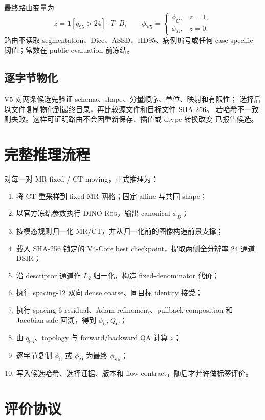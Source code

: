 \documentclass[11pt,a4paper]{ctexart}
\newcommand{\Dino}{\textsc{DINO-Reg}}
\begin{document}
最终路由变量为
\[
z=\mathbf{1}[q_{95}>24]\cdot T\cdot B,\qquad
\phi_{\mathrm{V5}}=
\begin{cases}
\phi_C,&z=1,\\
\phi_D,&z=0.
\end{cases}
\]
路由不读取 segmentation、Dice、ASSD、HD95、病例编号或任何 case-specific
阈值；常数在 public evaluation 前冻结。

\subsection{逐字节物化}
V5 对两条候选先验证 schema、shape、分量顺序、单位、映射和有限性；
选择后以文件复制物化到最终目录，再比较源文件和目标文件 SHA-256。
若哈希不一致则失败。这样可证明路由不会因重新保存、插值或 dtype 转换改变
已报告候选。

\section{完整推理流程}

对每一对 MR fixed / CT moving，正式推理为：
\begin{enumerate}
  \item 将 CT 重采样到 fixed MR 网格；固定 affine 与共同 shape；
  \item 以官方冻结参数执行 \Dino{}，输出 canonical $\phi_D$；
  \item 按模态规则归一化 MR/CT，并从归一化前的图像构造前景支撑；
  \item 载入 SHA-256 锁定的 V4-Core best checkpoint，提取两侧全分辨率
        24 通道 DSIR；
  \item 沿 descriptor 通道作 $L_2$ 归一化，构造 fixed-denominator 代价；
  \item 执行 spacing-12 双向 dense coarse、同目标 identity 接受；
  \item 执行 spacing-6 residual、Adam refinement、pullback composition 和
        Jacobian-safe 回溯，得到 $\phi_C,Q_C$；
  \item 由 $q_{95}$、topology 与 forward/backward QA 计算 $z$；
  \item 逐字节复制 $\phi_C$ 或 $\phi_D$ 为最终 $\phi_{\mathrm{V5}}$；
  \item 写入候选哈希、选择证据、版本和 flow contract，随后才允许做标签评价。
\end{enumerate}

\section{评价协议}
\end{document}
